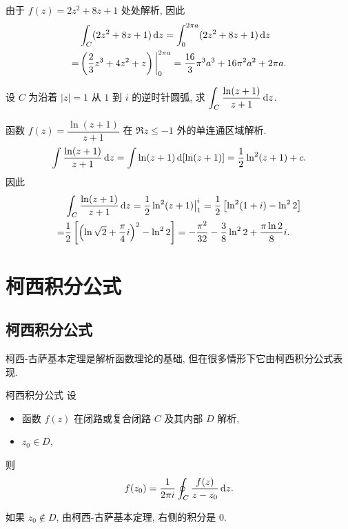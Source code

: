 \begin{solution}
	由于 $f(z)=2z^2+8z+1$ 处处解析, 因此
		\begin{align*}
		&\int_C(2z^2+8z+1)\,\mathrm{d} z=\int_0^{2\pi a}(2z^2+8z+1)\,\mathrm{d} z\\
		=&\left(\frac23z^3+4z^2+z\right)\bigg|_0^{2\pi a}=\frac{16}3\pi^3a^3+16\pi^2a^2+2\pi a.
		\end{align*}
\end{solution}

\begin{example}
	设 $C$ 为沿着 $|z|=1$ 从 $1$ 到 $i$ 的逆时针圆弧, 求 $\displaystyle\int_C\frac{\ln(z+1)}{z+1}\,\mathrm{d} z$.
\end{example}

\begin{solution}
	函数 $f(z)=\dfrac{\ln(z+1)}{z+1}$ 在 $\Re z\le -1$ 外的单连通区域解析.
	\[\int\frac{\ln(z+1)}{z+1}\,\mathrm{d} z
	=\int\ln(z+1)\,\mathrm{d}[\ln(z+1)]=\frac{1}{2}\ln^2(z+1)+c.\]
	因此
	\begin{align*}
	&\int_C\frac{\ln(z+1)}{z+1}\,\mathrm{d} z=\frac{1}{2}\ln^2(z+1)\big|_1^i
		=\frac{1}{2}\left[\ln^2(1+i)-\ln^22\right]\\
	=&\frac{1}{2}\left[\left(\ln\sqrt2+\frac\pi4i\right)^2-\ln^22\right]
		=-\frac{\pi^2}{32}-\frac38\ln^22+\frac{\pi\ln2}{8}i.
	\end{align*}
\end{solution}

\section{柯西积分公式}

\subsection{柯西积分公式}

柯西-古萨基本定理是解析函数理论的基础, 但在很多情形下它由柯西积分公式表现.

\begin{theorem}{柯西积分公式}
	设
	\begin{itemize}
		\item 函数 $f(z)$ 在闭路或复合闭路 $C$ 及其内部 $D$ 解析,
		\item $z_0\in D$,
	\end{itemize}
	则
		\[f(z_0)=\frac1{2\pi i}\oint_C\frac{f(z)}{z-z_0}\,\mathrm{d} z.\]
\end{theorem}

如果 $z_0\notin D$, 由柯西-古萨基本定理, 右侧的积分是 $0$.

